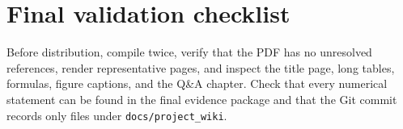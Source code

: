 \section{Final validation checklist}
Before distribution, compile twice, verify that the PDF has no unresolved
references, render representative pages, and inspect the title page, long
tables, formulas, figure captions, and the Q\&A chapter. Check that every
numerical statement can be found in the final evidence package and that the
Git commit records only files under \texttt{docs/project\_wiki}.
